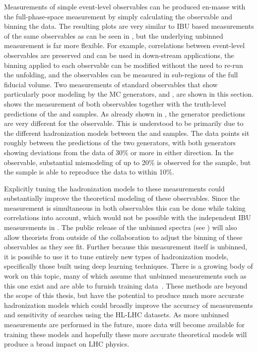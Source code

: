 Measurements of simple event-level observables can be produced en-masse with the full-phase-space measurement by simply calculating the observable and binning the data.
The resulting plots are very similar to IBU based measurements of the same observables as can be seen in , but the underlying unbinned measurement is far more flexible.
For example, correlations between event-level observables are preserved and can be used in down-stream applications, the binning applied to each observable can be modified without the need to re-run the unfolding, and the observables can be measured in sub-regions of the full fiducial volume.
Two measurements of standard observables that show particularly poor modeling by the MC generators, \nch and \HT, are shown in this section.
 shows the measurement of both observables together with the truth-level predictions of the \mgpy and \sherpa samples.
As already shown in , the generator predictions are very different for the \nch observable.
This is understood to be primarily due to the different hadronization models between the \mgpy and \sherpa samples.
The data points sit roughly between the predictions of the two generators, with both generators showing deviations from the data of 30\% or more in either direction.
In the \HT observable, substantial mismodeling of up to 20\% is observed for the \mgpy sample, but the \sherpa sample is able to reproduce the data to within 10\%.

Explicitly tuning the hadronization models to these measurements could substantially improve the theoretical modeling of these observables.
Since the measurement is simultaneous in both observables this can be done while taking correlations into account, which would not be possible with the independent IBU measurements in .
The public release of the unbinned spectra (see ) will also allow theorists from outside of the collaboration to adjust the binning of these observables as they see fit.
Further because this measurement itself is unbinned, it is possible to use it to tune entirely new types of hadronization models, specifically those built using deep learning techniques.
There is a growing body of work on this topic, many of which assume that unbinned measurements such as this one exist and are able to furnish training data~\cite{Assi:2025gog,Bierlich:2023fmh,Bierlich:2023zzd,Bierlich:2024xzg,Chan:2023ume,Ghosh:2022zdz,Ilten:2022jfm}.
These methods are beyond the scope of this thesis, but have the potential to produce much more accurate hadronization models which could broadly improve the accuracy of measurements and sensitivity of searches using the HL-LHC datasets.
As more unbinned measurements are performed in the future, more data will become available for training these models and hopefully these more accurate theoretical models will produce a broad impact on LHC physics.

